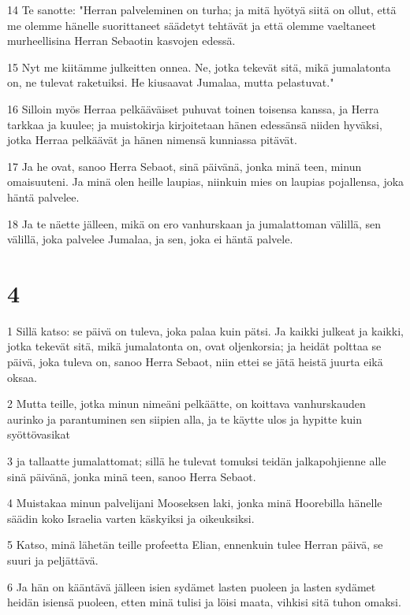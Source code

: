 \par 14 Te sanotte: "Herran palveleminen on turha; ja mitä hyötyä siitä on ollut, että me olemme hänelle suorittaneet säädetyt tehtävät ja että olemme vaeltaneet murheellisina Herran Sebaotin kasvojen edessä.
\par 15 Nyt me kiitämme julkeitten onnea. Ne, jotka tekevät sitä, mikä jumalatonta on, ne tulevat raketuiksi. He kiusaavat Jumalaa, mutta pelastuvat."
\par 16 Silloin myös Herraa pelkääväiset puhuvat toinen toisensa kanssa, ja Herra tarkkaa ja kuulee; ja muistokirja kirjoitetaan hänen edessänsä niiden hyväksi, jotka Herraa pelkäävät ja hänen nimensä kunniassa pitävät.
\par 17 Ja he ovat, sanoo Herra Sebaot, sinä päivänä, jonka minä teen, minun omaisuuteni. Ja minä olen heille laupias, niinkuin mies on laupias pojallensa, joka häntä palvelee.
\par 18 Ja te näette jälleen, mikä on ero vanhurskaan ja jumalattoman välillä, sen välillä, joka palvelee Jumalaa, ja sen, joka ei häntä palvele.

\chapter{4}

\par 1 Sillä katso: se päivä on tuleva, joka palaa kuin pätsi. Ja kaikki julkeat ja kaikki, jotka tekevät sitä, mikä jumalatonta on, ovat oljenkorsia; ja heidät polttaa se päivä, joka tuleva on, sanoo Herra Sebaot, niin ettei se jätä heistä juurta eikä oksaa.
\par 2 Mutta teille, jotka minun nimeäni pelkäätte, on koittava vanhurskauden aurinko ja parantuminen sen siipien alla, ja te käytte ulos ja hypitte kuin syöttövasikat
\par 3 ja tallaatte jumalattomat; sillä he tulevat tomuksi teidän jalkapohjienne alle sinä päivänä, jonka minä teen, sanoo Herra Sebaot.
\par 4 Muistakaa minun palvelijani Mooseksen laki, jonka minä Hoorebilla hänelle säädin koko Israelia varten käskyiksi ja oikeuksiksi.
\par 5 Katso, minä lähetän teille profeetta Elian, ennenkuin tulee Herran päivä, se suuri ja peljättävä.
\par 6 Ja hän on kääntävä jälleen isien sydämet lasten puoleen ja lasten sydämet heidän isiensä puoleen, etten minä tulisi ja löisi maata, vihkisi sitä tuhon omaksi.


